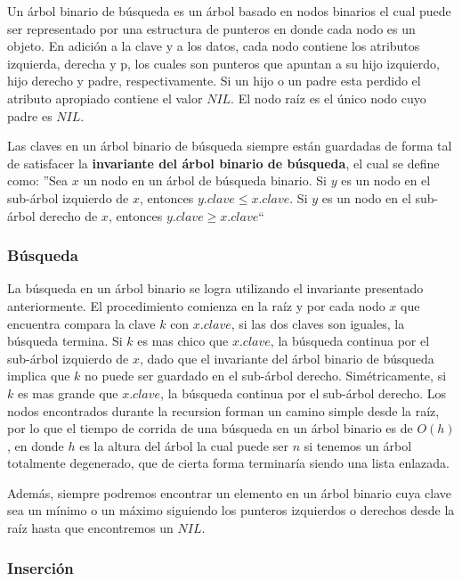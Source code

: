 \documentclass[10pt, a4paper]{report}
\begin{document}
Un \'arbol binario de b\'usqueda es un \'arbol basado en nodos binarios el cual puede ser representado por una estructura de punteros en donde cada nodo es un objeto. En adici\'on a la clave y a los datos, cada nodo contiene los atributos izquierda, derecha y p, los cuales son punteros que apuntan a su hijo izquierdo, hijo derecho y padre, respectivamente. Si un hijo o un padre esta perdido el atributo apropiado contiene el valor $NIL$. El nodo ra\'iz es el \'unico nodo cuyo padre es $NIL$.

Las claves en un \'arbol binario de b\'usqueda siempre est\'an guardadas de forma tal de satisfacer la \textbf{invariante del \'arbol binario de b\'usqueda}, el cual se define como: ''Sea $x$ un nodo en un \'arbol de b\'usqueda binario. Si $y$ es un nodo en el sub-\'arbol izquierdo de $x$, entonces $y.clave \leq x.clave$. Si $y$ es un nodo en el sub-\'arbol derecho de $x$, entonces $y.clave \geq x.clave$``

\subsubsection{B\'usqueda}

La b\'usqueda en un \'arbol binario se logra utilizando el invariante presentado anteriormente. El procedimiento comienza en la ra\'iz y por cada nodo $x$ que encuentra compara la clave $k$ con $x.clave$, si las dos claves son iguales, la b\'usqueda termina. Si $k$ es mas chico que $x.clave$, la b\'usqueda continua por el sub-\'arbol izquierdo de $x$, dado que el invariante del \'arbol binario de b\'usqueda implica que $k$ no puede ser guardado en el sub-\'arbol derecho. Sim\'etricamente, si $k$ es mas grande que $x.clave$, la b\'usqueda continua por el sub-\'arbol derecho. Los nodos encontrados durante la recursion forman un camino simple desde la ra\'iz, por lo que el tiempo de corrida de una b\'usqueda en un \'arbol binario es de $O(h)$, en donde $h$ es la altura del \'arbol la cual puede ser $n$ si tenemos un \'arbol totalmente degenerado, que de cierta forma terminar\'ia siendo una lista enlazada.

Adem\'as, siempre podremos encontrar un elemento en un \'arbol binario cuya clave sea un m\'inimo o un m\'aximo siguiendo los punteros izquierdos o derechos desde la ra\'iz hasta que encontremos un $NIL$.

\subsubsection{Inserci\'on}
\end{document}
